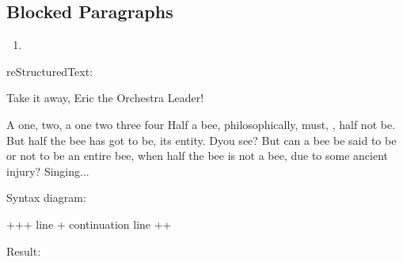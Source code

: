 \documentclass[letterpaper,12pt,english]{sphinxmanual}
\begin{document}
\subsection{Blocked Paragraphs}
\label{\detokenize{rtxt:blocked-paragraphs}}\begin{enumerate}
\def\theenumi{\arabic{enumi}}
\def\labelenumi{\theenumi .}
\makeatletter\def\p@enumii{\p@enumi \theenumi .}\makeatother
\item {} 

\end{enumerate}

reStructuredText:

\begin{sphinxVerbatim}[commandchars=\\\{\}]
Take it away, Eric the Orchestra Leader!

     A one, two, a one two three four
    \textbar{}
     Half a bee, philosophically,
         must, , half not be.
     But half the bee has got to be,
          its entity.  D\PYGZsq{}you see?
    \textbar{}
     But can a bee be said to be
         or not to be an entire bee,
             when half the bee is not a bee,
                 due to some ancient injury?
    \textbar{}
     Singing...
\end{sphinxVerbatim}

Syntax diagram:

\begin{sphinxVerbatim}[commandchars=\\\{\}]
+\PYGZhy{}\PYGZhy{}\PYGZhy{}\PYGZhy{}\PYGZhy{}\PYGZhy{}+\PYGZhy{}\PYGZhy{}\PYGZhy{}\PYGZhy{}\PYGZhy{}\PYGZhy{}\PYGZhy{}\PYGZhy{}\PYGZhy{}\PYGZhy{}\PYGZhy{}\PYGZhy{}\PYGZhy{}\PYGZhy{}\PYGZhy{}\PYGZhy{}\PYGZhy{}\PYGZhy{}\PYGZhy{}\PYGZhy{}\PYGZhy{}\PYGZhy{}\PYGZhy{}+
 \PYGZdq{}\textbar{} \PYGZdq{} \textbar{} line                  \textbar{}
+\PYGZhy{}\PYGZhy{}\PYGZhy{}\PYGZhy{}\PYGZhy{}\PYGZhy{}\textbar{} continuation line     \textbar{}
       +\PYGZhy{}\PYGZhy{}\PYGZhy{}\PYGZhy{}\PYGZhy{}\PYGZhy{}\PYGZhy{}\PYGZhy{}\PYGZhy{}\PYGZhy{}\PYGZhy{}\PYGZhy{}\PYGZhy{}\PYGZhy{}\PYGZhy{}\PYGZhy{}\PYGZhy{}\PYGZhy{}\PYGZhy{}\PYGZhy{}\PYGZhy{}\PYGZhy{}\PYGZhy{}+
\end{sphinxVerbatim}

Result:
\end{document}
